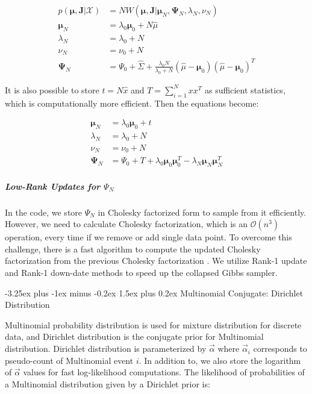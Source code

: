 \documentclass[12pt, a4paper]{article}
\makeatletter
\renewcommand{\paragraph}{\@startsection{paragraph}{4}{0ex}%
    {-3.25ex plus -1ex minus -0.2ex}%
    {1.5ex plus 0.2ex}%
    {\normalfont\normalsize\bfseries}}
\makeatother
\begin{document}
\begin{align}
p(\boldsymbol\mu,\boldsymbol J|\mathcal{X}) & = NW(\boldsymbol\mu,\boldsymbol J| \boldsymbol  \mu_N,  \boldsymbol  \Psi_N, \lambda_N, \nu_N)  \\
\boldsymbol \mu_N & = \lambda_0 \boldsymbol \mu_0 + N \hat{\mu} \\
\lambda_N & = \lambda_0 + N \\
\nu_N & = \nu_0 + N \\
\boldsymbol \Psi_N &=  \Psi_0 + \hat{\Sigma} + \frac{\lambda_0N}{\lambda_0+N}(\hat{\mu}-\boldsymbol \mu_0)(\hat{\mu}-\boldsymbol \mu_0)^T
\end{align}

It is also possible to store \(t =N\hat{x}\) and \(T=\sum_{i=1}^Nxx^T\)
as sufficient statistics, which is computationally more efficient. Then the
equations become:

\begin{align*}
\boldsymbol \mu_N & = \lambda_0 \boldsymbol \mu_0 + t \\
\lambda_N & = \lambda_0 + N \\
\nu_N & = \nu_0 + N \\
\boldsymbol \Psi_N &=  \Psi_0 + T + \lambda_0\boldsymbol\mu_0\boldsymbol\mu_0^T-\lambda_N\boldsymbol\mu_N\boldsymbol\mu_N ^T
\end{align*}


\subparagraph{Low-Rank Updates for
\(\Psi_N\)}

In the code, we store \(\Psi_N\) in Cholesky factorized form to sample from it
efficiently. However, we need to calculate Cholesky factorization, which is an
$\mathcal{O}(n^3)$ operation, every time if we remove or add single data point.
To overcome this challenge, there is a fast algorithm to compute the updated Cholesky
factorization from the previous Cholesky factorization \cite{Seeger:161468}. We utilize Rank-1
update and Rank-1 down-date methods to speed up the collapsed Gibbs sampler.


\paragraph{Multinomial Conjugate: Dirichlet Distribution}

Multinomial probability distribution is used for mixture distribution for discrete data, and Dirichlet distribution is the conjugate prior for Multinomial distribution. Dirichlet distribution is parameterized by $\vec{\alpha}$ where $\vec{\alpha}_i$ corresponds to pseudo-count of Multinomial event $i$. In addition to, we also store the logarithm of $\vec\alpha$ values for fast log-likelihood computations. The likelihood of probabilities of a Multinomial distribution given by a Dirichlet prior is:
\end{document}
